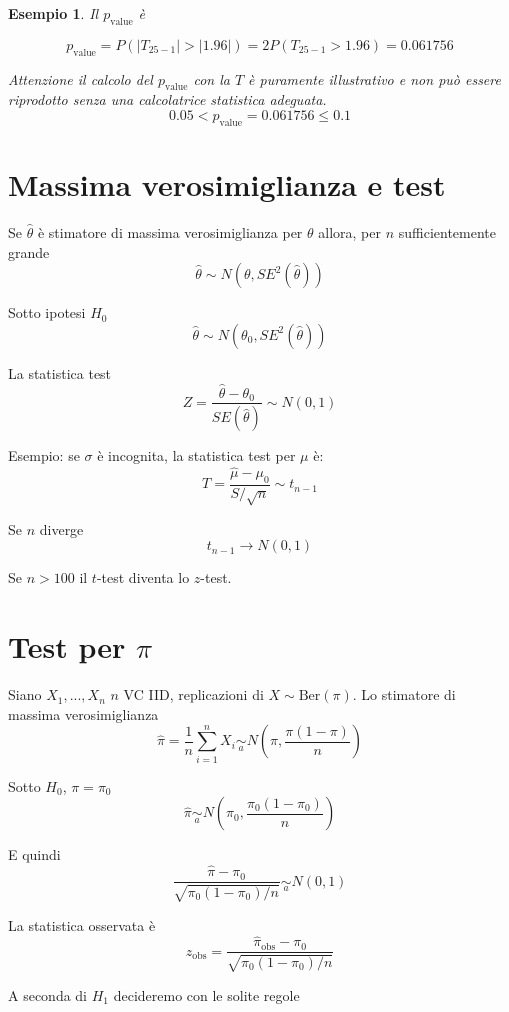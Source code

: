 \documentclass[
  11pt,
]{book}
\theoremstyle{mytheoremstyle}
\theoremstyle{mydefstyle}
\newtheorem{example}{{Esempio}}[section]
\begin{document}
\begin{example}
Il \(p_{\text{value}}\) è

\[ p_{\text{value}} = P(|T_{25-1}|>|1.96|)=2P(T_{25-1}>1.96)=0.061756 \]

Attenzione il calcolo del \(p_\text{value}\) con la \(T\) è puramente illustrativo e non può essere riprodotto senza una calcolatrice statistica adeguata.\[
 0.05 < p_\text{value}= 0.061756 \leq 0.1 
\]
\end{example}

\section{Massima verosimiglianza e test}\label{massima-verosimiglianza-e-test}

Se \(\hat\theta\) è stimatore di massima verosimiglianza per \(\theta\)
allora, per \(n\) sufficientemente grande
\[\hat\theta\sim N(\theta, SE^2(\hat\theta))\]

Sotto ipotesi \(H_0\) \[\hat\theta\sim N(\theta_0, SE^2(\hat\theta))\]

La statistica test
\[Z=\frac{\hat\theta-\theta_0}{SE(\hat\theta)}\sim N(0,1)\]

Esempio: se \(\sigma\) è incognita, la statistica test per \(\mu\) è:
\[T=\frac{\hat\mu-\mu_0}{S/\sqrt n}\sim t_{n-1}\]

Se \(n\) diverge \[t_{n-1}\to N(0,1)\]

Se \(n>100\) il \(t\)-test diventa lo \(z\)-test.

\section{\texorpdfstring{Test per \(\pi\)}{Test per \textbackslash pi}}\label{test-per-pi}

\begin{info}
Siano \(X_1,...,X_n\) \(n\) VC IID, replicazioni di \(X\sim\text{Ber}(\pi)\).
Lo stimatore di massima verosimiglianza
\[\hat\pi=\frac 1 n \sum_{i=1}^n X_i\operatorname*{\sim}_a N\left(\pi,\frac{\pi(1-\pi)}{n}\right)\]

Sotto \(H_0\), \(\pi=\pi_0\)
\[\hat\pi\operatorname*{\sim}_a N\left(\pi_0,\frac{\pi_0(1-\pi_0)}{n}\right)\]

E quindi
\[\frac{\hat\pi-\pi_0}{\sqrt{\pi_0(1-\pi_0)/n}}\operatorname*{\sim}_a N(0,1)\]

La statistica osservata è
\[z_{\text{obs}}=\frac{\hat\pi_{\text{obs}}-\pi_0}{\sqrt{\pi_0(1-\pi_0)/n}}\]

A seconda di \(H_1\) decideremo con le solite regole

\end{info}
\end{document}
